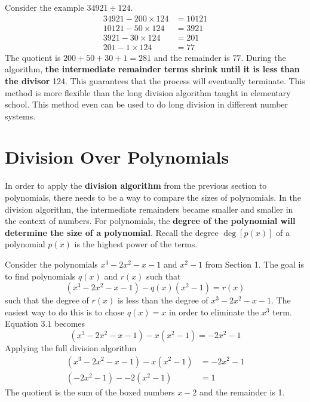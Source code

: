 \documentclass[12pt]{article}
\numberwithin{equation}{section}
\begin{document}
\vspace{1em}
\vspace{1em}

\noindent Consider the example $34921 \div 124$.
\begin{align*}
34921 - \boxed{200} \times 124 &= 10121 \\
10121 - \boxed{50} \times 124 &= 3921 \\
3921 - \boxed{30} \times 124 &= 201 \\
201 - \boxed{1} \times 124 &= 77
\end{align*}
The quotient is $200+50+30+1 = 281$ and the remainder is $77$. During the algorithm, \textbf{the intermediate remainder terms shrink until it is less than the divisor} 124. This guarantees that the process will eventually terminate. This method is more flexible than the long division algorithm taught in elementary school. This method even can be used to do long division in different number systems.

\section{Division Over Polynomials}
In order to apply the \textbf{division algorithm} from the previous section to polynomials, there needs to be a way to compare the sizes of polynomials. In the division algorithm, the intermediate remainders became smaller and smaller in the context of numbers. For polynomials, the \textbf{degree of the polynomial will determine the size of a polynomial}. Recall the degree $\deg[p(x)]$ of a polynomial $p(x)$ is the highest power of the terms.

Consider the polynomials $x^3-2x^2-x-1$ and $x^2-1$ from Section 1. The goal is to find polynomials $q(x)$ and $r(x)$ such that 
\begin{equation}
(x^3-2x^2-x-1) - \boxed{q(x)} (x^2-1) = r(x)
\end{equation}
such that the degree of $r(x)$ is less than the degree of $x^3-2x^2-x-1$. The easiest way to do this is to chose $q(x) = x$ in order to eliminate the $x^3$ term. Equation 3.1 becomes
\begin{equation}
(x^3-2x^2-x-1) - \boxed{x} (x^2-1) = -2x^2-1
\end{equation}
Applying the full division algorithm
\begin{align*}
(x^3-2x^2-x-1) - \boxed{x} (x^2-1) &= -2x^2-1 \\
(-2x^2-1) - \boxed{-2}(x^2-1) &= 1
\end{align*}
The quotient is the sum of the boxed numbers $x-2$ and the remainder is 1.
\end{document}
